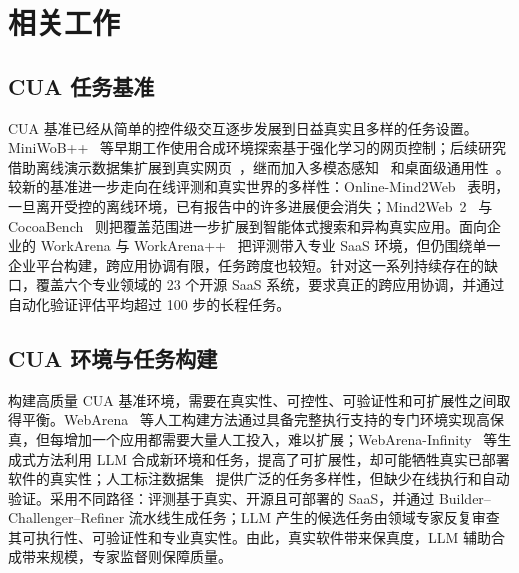 \section{相关工作}
\label{rw}

\subsection{CUA 任务基准}

CUA 基准已经从简单的控件级交互逐步发展到日益真实且多样的任务设置。MiniWoB++~\cite{miniwob} 等早期工作使用合成环境探索基于强化学习的网页控制；后续研究借助离线演示数据集扩展到真实网页~\cite{mind2web,webarena}，继而加入多模态感知~\cite{visualwebarena} 和桌面级通用性~\cite{osworld}。较新的基准进一步走向在线评测和真实世界的多样性：Online-Mind2Web~\cite{onlinemind2web} 表明，一旦离开受控的离线环境，已有报告中的许多进展便会消失；Mind2Web~2~\cite{mind2web2} 与 CocoaBench~\cite{cocoabench} 则把覆盖范围进一步扩展到智能体式搜索和异构真实应用。面向企业的 WorkArena 与 WorkArena++~\cite{workarena,workarenaplus} 把评测带入专业 SaaS 环境，但仍围绕单一企业平台构建，跨应用协调有限，任务跨度也较短。\datasetname 针对这一系列持续存在的缺口，覆盖六个专业领域的 23 个开源 SaaS 系统，要求真正的跨应用协调，并通过自动化验证评估平均超过 100 步的长程任务。

\subsection{CUA 环境与任务构建}

构建高质量 CUA 基准环境，需要在真实性、可控性、可验证性和可扩展性之间取得平衡。WebArena~\cite{webarena} 等人工构建方法通过具备完整执行支持的专门环境实现高保真，但每增加一个应用都需要大量人工投入，难以扩展；WebArena-Infinity~\cite{wainfinity} 等生成式方法利用 LLM 合成新环境和任务，提高了可扩展性，却可能牺牲真实已部署软件的真实性；人工标注数据集~\cite{mind2web} 提供广泛的任务多样性，但缺少在线执行和自动验证。\datasetname 采用不同路径：评测基于真实、开源且可部署的 SaaS，并通过 Builder--Challenger--Refiner 流水线生成任务；LLM 产生的候选任务由领域专家反复审查其可执行性、可验证性和专业真实性。由此，真实软件带来保真度，LLM 辅助合成带来规模，专家监督则保障质量。
